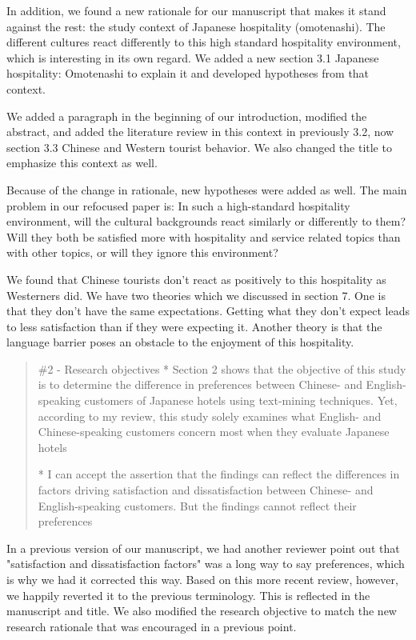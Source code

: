 \documentclass{letter}
\begin{document}
In addition, we found a new rationale for our manuscript that makes it stand against the rest: the study context of Japanese hospitality (omotenashi). The different cultures react differently to this high standard hospitality environment, which is interesting in its own regard. We added a new section 3.1  Japanese hospitality: Omotenashi to explain it and developed hypotheses from that context.

We added a paragraph in the beginning of our introduction, modified the abstract, and added the literature review in this context in previously 3.2, now section 3.3 Chinese and Western tourist behavior. We also changed the title to emphasize this context as well. 

Because of the change in rationale, new hypotheses were added as well. The main problem in our refocused paper is: In such a high-standard hospitality environment, will the cultural backgrounds react similarly or differently to them? Will they both be satisfied more with hospitality and service related topics than with other topics, or will they ignore this environment?

We found that Chinese tourists don't react as positively to this hospitality as Westerners did. We have two theories which we discussed in section 7. One is that they don't have the same expectations. Getting what they don't expect leads to less satisfaction than if they were expecting it. Another theory is that the language barrier poses an obstacle to the enjoyment of this hospitality.


\begin{quotation}
\#2 - Research objectives
*  Section 2 shows that the objective of this study is to determine the difference in preferences between Chinese- and English-speaking customers of Japanese hotels using text-mining techniques. Yet, according to my review, this study solely examines what English- and Chinese-speaking customers concern most when they evaluate Japanese hotels

*  I can accept the assertion that the findings can reflect the differences in factors driving satisfaction and dissatisfaction between Chinese- and English-speaking customers. But the findings cannot reflect their preferences
\end{quotation}


In a previous version of our manuscript, we had another reviewer point out that "satisfaction and dissatisfaction factors" was a long way to say preferences, which is why we had it corrected this way. Based on this more recent review, however, we happily reverted it to the previous terminology. This is reflected in the manuscript and title. We also modified the research objective to match the new research rationale that was encouraged in a previous point.
\end{document}
